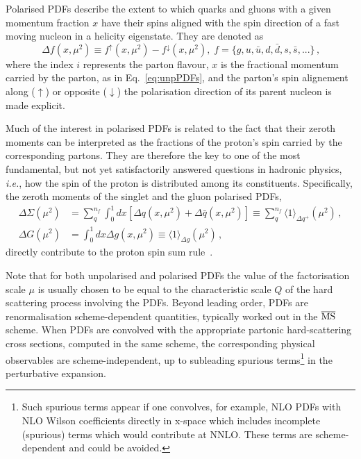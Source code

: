 Polarised PDFs describe the extent to which quarks and gluons 
with a given momentum fraction $x$ have their spins aligned with the spin 
direction of a fast moving nucleon in a helicity eigenstate. 
%
They are denoted as 
\begin{equation}
\Delta f(x,\mu^2) \equiv f^{\uparrow}(x,\mu^2) - f^{\downarrow}(x,\mu^2)
\mbox{,} \ \ f=\{g,u,\bar{u},d,\bar{d},s,\bar{s},...\}
\,\mbox{,}
\label{eq:polPDFs}
\end{equation}
where the index $i$ represents the parton flavour, $x$ is the fractional 
momentum carried by the parton, as in Eq.~\eqref{eq:unpPDFs},  
and the parton's spin alignement along ($\uparrow$) or opposite 
($\downarrow$) the polarisation direction of its parent nucleon
is made explicit.

Much of the interest in polarised PDFs is related to the fact that 
their zeroth moments can be interpreted as the fractions of the proton's 
spin carried by the corresponding partons.
%
They are therefore the key to one of the most fundamental, 
but not yet satisfactorily answered questions in hadronic physics,
{\it i.e.}, how the spin of the proton is distributed among its constituents.
%
Specifically, the zeroth moments of the singlet and the gluon polarised PDFs,
\begin{align}
\Delta\Sigma(\mu^2)
& =
\sum_{q}^{n_f}\int_0^1 dx 
\left[\Delta q(x, \mu^2) + \Delta\bar{q}(x, \mu^2)\right]
\equiv
\sum_q^{n_f}\langle 1 \rangle_{\Delta q^+}(\mu^2)\,,
\\
\Delta G(\mu^2)
& =
\int_0^1 dx \Delta g(x,\mu^2)
\equiv
\langle 1 \rangle_{\Delta g}(\mu^2)
\,,
\label{eq:moments}
\end{align}
directly contribute to the proton spin sum rule~\cite{Leader:2013jra}.

Note that for both unpolarised and polarised PDFs the value of the 
factorisation scale $\mu$ is usually chosen to be equal to the characteristic 
scale $Q$ of the hard scattering process involving the PDFs.
%
Beyond leading order, PDFs are renormalisation scheme-dependent 
quantities, typically worked out in the $\overline{\rm MS}$ scheme.
%
When PDFs are convolved with the appropriate partonic hard-scattering 
cross sections, computed in the same scheme, the corresponding physical 
observables are scheme-independent, up to subleading spurious 
terms\footnote{Such spurious terms appear if one convolves, for example, 
 NLO PDFs with NLO Wilson coefficients directly in x-space which includes 
 incomplete (spurious) terms which would contribute at NNLO. 
 These terms are scheme-dependent and could be avoided.} in the 
perturbative expansion. 

